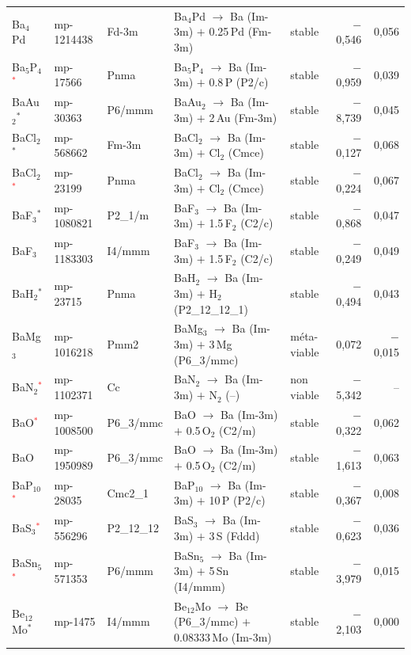 \begin{longtable}{@{}ll l@{\hspace{4pt}} p{4.6cm} l@{\hspace{4pt}} rr@{}}
Ba$_{4}$Pd & mp-1214438 & Fd-3m & Ba$_{4}$Pd $\to$ Ba (Im-3m) $+$ 0.25\,Pd (Fm-3m) & stable & $-$0{,}546 & 0{,}056 \\
Ba$_{5}$P$_{4}$\textcolor{red}{$^*$} & mp-17566 & Pnma & Ba$_{5}$P$_{4}$ $\to$ Ba (Im-3m) $+$ 0.8\,P (P2/c) & stable & $-$0{,}959 & 0{,}039 \\
BaAu$_{2}$$^*$ & mp-30363 & P6/mmm & BaAu$_{2}$ $\to$ Ba (Im-3m) $+$ 2\,Au (Fm-3m) & stable & $-$8{,}739 & 0{,}045 \\
BaCl$_{2}$$^*$ & mp-568662 & Fm-3m & BaCl$_{2}$ $\to$ Ba (Im-3m) $+$ Cl$_{2}$ (Cmce) & stable & $-$0{,}127 & 0{,}068 \\
BaCl$_{2}$\textcolor{red}{$^*$} & mp-23199 & Pnma & BaCl$_{2}$ $\to$ Ba (Im-3m) $+$ Cl$_{2}$ (Cmce) & stable & $-$0{,}224 & 0{,}067 \\
BaF$_{3}$$^*$ & mp-1080821 & P2\_1/m & BaF$_{3}$ $\to$ Ba (Im-3m) $+$ 1.5\,F$_{2}$ (C2/c) & stable & $-$0{,}868 & 0{,}047 \\
BaF$_{3}$ & mp-1183303 & I4/mmm & BaF$_{3}$ $\to$ Ba (Im-3m) $+$ 1.5\,F$_{2}$ (C2/c) & stable & $-$0{,}249 & 0{,}049 \\
BaH$_{2}$$^*$ & mp-23715 & Pnma & BaH$_{2}$ $\to$ Ba (Im-3m) $+$ H$_{2}$ (P2\_12\_12\_1) & stable & $-$0{,}494 & 0{,}043 \\
BaMg$_{3}$ & mp-1016218 & Pmm2 & BaMg$_{3}$ $\to$ Ba (Im-3m) $+$ 3\,Mg (P6\_3/mmc) & m\'eta-viable & 0{,}072 & $-$0{,}015 \\
BaN$_{2}$\textcolor{red}{$^*$} & mp-1102371 & Cc & BaN$_{2}$ $\to$ Ba (Im-3m) $+$ N$_{2}$ (--) & non viable & $-$5{,}342 & -- \\
BaO\textcolor{red}{$^*$} & mp-1008500 & P6\_3/mmc & BaO $\to$ Ba (Im-3m) $+$ 0.5\,O$_{2}$ (C2/m) & stable & $-$0{,}322 & 0{,}062 \\
BaO & mp-1950989 & P6\_3/mmc & BaO $\to$ Ba (Im-3m) $+$ 0.5\,O$_{2}$ (C2/m) & stable & $-$1{,}613 & 0{,}063 \\
BaP$_{10}$\textcolor{red}{$^*$} & mp-28035 & Cmc2\_1 & BaP$_{10}$ $\to$ Ba (Im-3m) $+$ 10\,P (P2/c) & stable & $-$0{,}367 & 0{,}008 \\
BaS$_{3}$\textcolor{red}{$^*$} & mp-556296 & P2\_12\_12 & BaS$_{3}$ $\to$ Ba (Im-3m) $+$ 3\,S (Fddd) & stable & $-$0{,}623 & 0{,}036 \\
BaSn$_{5}$\textcolor{red}{$^*$} & mp-571353 & P6/mmm & BaSn$_{5}$ $\to$ Ba (Im-3m) $+$ 5\,Sn (I4/mmm) & stable & $-$3{,}979 & 0{,}015 \\
Be$_{12}$Mo$^*$ & mp-1475 & I4/mmm & Be$_{12}$Mo $\to$ Be (P6\_3/mmc) $+$ 0.08333\,Mo (Im-3m) & stable & $-$2{,}103 & 0{,}000 \\

\end{longtable}
